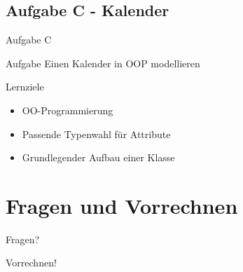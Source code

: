 \documentclass[aspectratio=169]{beamer}
\begin{document}
\subsection{Aufgabe C - Kalender}

\begin{frame}{Aufgabe C}
  \begin{block}{Aufgabe}
    \pause
    Einen Kalender in OOP modellieren
  \end{block}

  \pause
  \begin{block}{Lernziele}
    \begin{itemize}
      \item OO-Programmierung
      \pause
      \item Passende Typenwahl für Attribute
      \pause
      \item Grundlegender Aufbau einer Klasse
    \end{itemize}
  \end{block}
\end{frame}
\section{Fragen und Vorrechnen}

\begin{frame}
  \begin{center}\LARGE Fragen?\end{center}
\end{frame}

\begin{frame}
  \begin{center}\LARGE Vorrechnen!\end{center}
\end{frame}
\end{document}
